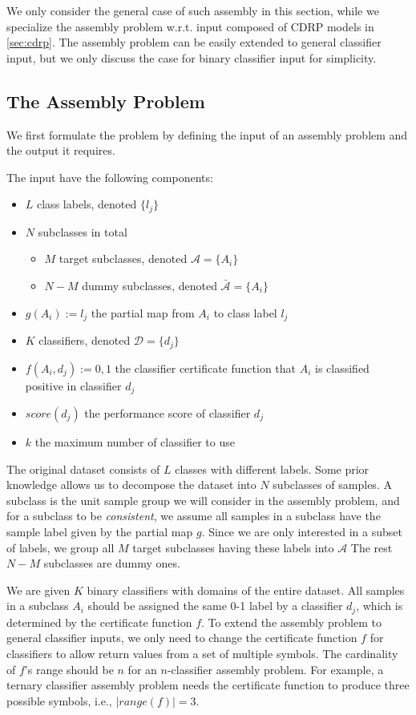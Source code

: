 \documentclass[sigplan,10pt,review]{acmart}\settopmatter{printfolios=true,printccs=false,printacmref=false}
\begin{document}
We only consider the general case of such assembly in this section, while we specialize the assembly problem w.r.t. input composed of CDRP models in \cref{sec:cdrp}.
The assembly problem can be easily extended to general classifier input, but we only discuss the case for binary classifier input for simplicity.

\subsection{The Assembly Problem}
\label{sec:assemble-problem}
We first formulate the problem by defining the input of an assembly problem and the output it requires.

The input have the following components:
\begin{itemize}
	\item $L$ class labels, denoted $\{l_j\}$
	\item $N$ subclasses in total \begin{itemize}
		\item $M$ target subclasses, denoted $\mathcal{A} = \{A_i\}$
		\item $N-M$ dummy subclasses, denoted $\bar{\mathcal{A}} = \{A_i\}$
	\end{itemize}
	\item $g(A_i) := l_j$ the partial map from $A_i$ to class label $l_j$
	\item $K$ classifiers, denoted $\mathcal{D} = \{d_j\}$
	\item $f(A_i, d_j) := 0, 1$ the classifier certificate function that $A_i$ is classified positive in classifier $d_j$
	\item $score(d_j)$ the performance score of classifier $d_j$
	\item $k$ the maximum number of classifier to use
\end{itemize}

The original dataset consists of $L$ classes with different labels.
Some prior knowledge allows us to decompose the dataset into $N$ subclasses of samples.
A subclass is the unit sample group we will consider in the assembly problem, and for a subclass to be \textit{consistent}, we assume all samples in a subclass have the sample label given by the partial map $g$.
Since we are only interested in a subset of labels, we group all $M$ target subclasses having these labels into $\mathcal{A}$
The rest $N-M$ subclasses are dummy ones.

We are given $K$ binary classifiers with domains of the entire dataset.
All samples in a subclass $A_i$ should be assigned the same 0-1 label by a classifier $d_j$, which is determined by the certificate function $f$.
To extend the assembly problem to general classifier inputs, we only need to change the certificate function $f$ for classifiers to allow return values from a set of multiple symbols.
The cardinality of $f$'s range should be $n$ for an $n$-classifier assembly problem.
For example, a ternary classifier assembly problem needs the certificate function to produce three possible symbols, i.e., $|range(f)| = 3$.
\end{document}
